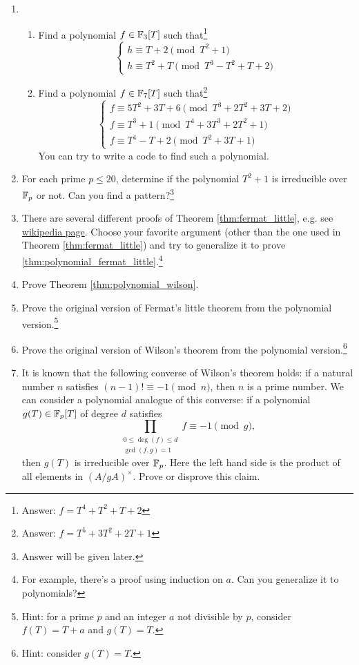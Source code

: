 \begin{enumerate}
    \item
    \begin{enumerate}
        \item Find a polynomial $f \in \mathbb{F}_3[T]$ such that\footnote{Answer: $f = T^4 + T^2 + T + 2$}
        \[
        \begin{cases}
            h \equiv T + 2 \pmod{T^2 + 1} \\
            h \equiv T^2 + T \pmod{T^3 - T^2 +  T + 2}
        \end{cases} 
        \]
        \item Find a polynomial $f \in \mathbb{F}_{7}[T]$ such that\footnote{Answer: $f = T^5 + 3T^2 + 2T + 1$}
        \[
        \begin{cases}
            f \equiv 5T^2 + 3T + 6 \pmod{T^3 + 2T^2 + 3T + 2} \\
            f \equiv T^3 + 1 \pmod{T^4 + 3T^3 + 2T^2 + 1} \\
            f \equiv T^4 - T + 2 \pmod{T^2 + 3T + 1}
        \end{cases} 
        \]
        You can try to write a code to find such a polynomial.
    \end{enumerate}
    \item For each prime $p \le 20$, determine if the polynomial $T^2 + 1$ is irreducible over $\mathbb{F}_p$ or not. Can you find a pattern?\footnote{Answer will be given later.}
    \item There are several different proofs of Theorem \ref{thm:fermat_little}, e.g. see \href{https://en.wikipedia.org/wiki/Proofs_of_Fermat%27s_little_theorem}{wikipedia page}.
    Choose your favorite argument (other than the one used in Theorem \ref{thm:fermat_little}) and try to generalize it to prove \ref{thm:polynomial_fermat_little}.\footnote{For example, there's a proof using induction on $a$. Can you generalize it to polynomials?}
    \item Prove Theorem \ref{thm:polynomial_wilson}.
    \item Prove the original version of Fermat's little theorem from the polynomial version.\footnote{Hint: for a prime $p$ and an integer $a$ not divisible by $p$, consider $f(T) = T + a$ and $g(T) = T$.}
    \item Prove the original version of Wilson's theorem from the polynomial version.\footnote{Hint: consider $g(T) = T$.} 
    \item It is known that the following converse of Wilson's theorem holds: if a natural number $n$ satisfies $(n - 1)! \equiv -1 \pmod{n}$, then $n$ is a prime number.
    We can consider a polynomial analogue of this converse: if a polynomial $g(T) \in \mathbb{F}_p[T]$ of degree $d$ satisfies
    \[
        \prod_{\substack{0 \le \deg(f) \le d \\ \gcd(f, g) = 1}} f \equiv -1 \pmod{g},
    \]
    then $g(T)$ is irreducible over $\mathbb{F}_p$.
    Here the left hand side is the product of all elements in $(A / gA)^\times$.
    Prove or disprove this claim.
\end{enumerate}